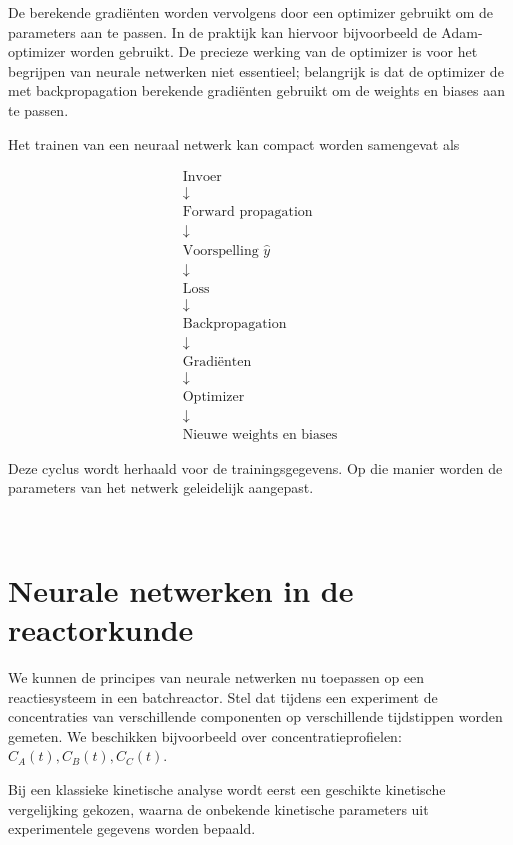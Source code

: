 \documentclass{ximera}
\begin{document}
De berekende gradiënten worden vervolgens door een optimizer gebruikt om de parameters aan te passen. In de praktijk kan hiervoor bijvoorbeeld de Adam-optimizer worden gebruikt. De precieze werking van de optimizer is voor het begrijpen van neurale netwerken niet essentieel; belangrijk is dat de optimizer de met backpropagation berekende gradiënten gebruikt om de weights en biases aan te passen.


\begin{conclusion} \text{ }

Het trainen van een neuraal netwerk kan compact worden samengevat als

\[
\boxed{
\begin{array}{c}
\text{Invoer}\\
\downarrow\\
\text{Forward propagation}\\
\downarrow\\
\text{Voorspelling }\hat{y}\\
\downarrow\\
\text{Loss}\\
\downarrow\\
\text{Backpropagation}\\
\downarrow\\
\text{Gradiënten}\\
\downarrow\\
\text{Optimizer}\\
\downarrow\\
\text{Nieuwe weights en biases}
\end{array}
}
\]

Deze cyclus wordt herhaald voor de trainingsgegevens. Op die manier worden de parameters van het netwerk geleidelijk aangepast.
\end{conclusion} 
\text{ } \\


\section*{Neurale netwerken in de reactorkunde}

We kunnen de principes van neurale netwerken nu toepassen op een reactiesysteem in een batchreactor. Stel dat tijdens een experiment de concentraties van verschillende componenten op verschillende tijdstippen worden gemeten. 
We beschikken bijvoorbeeld over concentratieprofielen: $C_A(t), C_B(t), C_C(t)$. 

Bij een klassieke kinetische analyse wordt eerst een geschikte kinetische vergelijking gekozen, waarna de onbekende kinetische parameters uit experimentele gegevens worden bepaald. 
\end{document}
